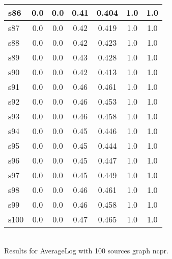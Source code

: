 \documentclass{article}
\begin{document}
\begin{tabular}{|l|c|c|c|c|c|c|}
\hline
s86 &0.0 & 0.0 & 0.41 & 0.404 & 1.0 & 1.0\\
\hline
s87 &0.0 & 0.0 & 0.42 & 0.419 & 1.0 & 1.0\\
\hline
s88 &0.0 & 0.0 & 0.42 & 0.423 & 1.0 & 1.0\\
\hline
s89 &0.0 & 0.0 & 0.43 & 0.428 & 1.0 & 1.0\\
\hline
s90 &0.0 & 0.0 & 0.42 & 0.413 & 1.0 & 1.0\\
\hline
s91 &0.0 & 0.0 & 0.46 & 0.461 & 1.0 & 1.0\\
\hline
s92 &0.0 & 0.0 & 0.46 & 0.453 & 1.0 & 1.0\\
\hline
s93 &0.0 & 0.0 & 0.46 & 0.458 & 1.0 & 1.0\\
\hline
s94 &0.0 & 0.0 & 0.45 & 0.446 & 1.0 & 1.0\\
\hline
s95 &0.0 & 0.0 & 0.45 & 0.444 & 1.0 & 1.0\\
\hline
s96 &0.0 & 0.0 & 0.45 & 0.447 & 1.0 & 1.0\\
\hline
s97 &0.0 & 0.0 & 0.45 & 0.449 & 1.0 & 1.0\\
\hline
s98 &0.0 & 0.0 & 0.46 & 0.461 & 1.0 & 1.0\\
\hline
s99 &0.0 & 0.0 & 0.46 & 0.458 & 1.0 & 1.0\\
\hline
s100 &0.0 & 0.0 & 0.47 & 0.465 & 1.0 & 1.0\\
\hline
\end{tabular}\\

\noindent Results for AverageLog with 100 sources graph ncpr.
\end{document}
